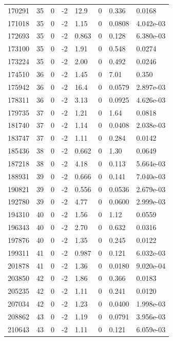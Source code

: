 \documentclass[preview]{standalone}
\begin{document}
{{{{{{{{{\begin{tabular}{L{1.2cm}C{1.2cm} C{0.3cm}C{0.5cm} C{1.4cm}C{1.4cm} C{1.4cm}C{1.4cm}}
  170291  &    35  & 0     & -2 &  12.9  & 0  & 0.336 &  0.0168   \\ 
  171018  &    35  & 0     & -2 &  1.15  & 0  & 0.0808 &  4.042e-03   \\ 
  172693  &    35  & 0     & -2 &  0.863  & 0  & 0.128 &  6.380e-03   \\ 
  173100  &    35  & 0     & -2 &  1.91  & 0  & 0.548 &  0.0274   \\ 
  173224  &    35  & 0     & -2 &  2.00  & 0  & 0.492 &  0.0246   \\ 
  174510  &    36  & 0     & -2 &  1.45  & 0  & 7.01 &  0.350   \\ 
  175942  &    36  & 0     & -2 &  16.4  & 0  & 0.0579 &  2.897e-03   \\ 
  178311  &    36  & 0     & -2 &  3.13  & 0  & 0.0925 &  4.626e-03   \\ 
  179735  &    37  & 0     & -2 &  1.21  & 0  & 1.64 &  0.0818   \\ 
  181740  &    37  & 0     & -2 &  1.14  & 0  & 0.0408 &  2.038e-03   \\ 
  183747  &    37  & 0     & -2 &  1.11  & 0  & 0.284 &  0.0142   \\ 
  185436  &    38  & 0     & -2 &  0.662  & 0  & 1.30 &  0.0649   \\ 
  187218  &    38  & 0     & -2 &  4.18  & 0  & 0.113 &  5.664e-03   \\ 
  188931  &    39  & 0     & -2 &  0.666  & 0  & 0.141 &  7.040e-03   \\ 
  190821  &    39  & 0     & -2 &  0.556  & 0  & 0.0536 &  2.679e-03   \\ 
  192780  &    39  & 0     & -2 &  4.77  & 0  & 0.0600 &  2.999e-03   \\ 
  194310  &    40  & 0     & -2 &  1.56  & 0  & 1.12 &  0.0559   \\ 
  196343  &    40  & 0     & -2 &  2.70  & 0  & 0.632 &  0.0316   \\ 
  197876  &    40  & 0     & -2 &  1.35  & 0  & 0.245 &  0.0122   \\ 
  199311  &    41  & 0     & -2 &  0.987  & 0  & 0.121 &  6.032e-03   \\ 
  201878  &    41  & 0     & -2 &  1.36  & 0  & 0.0180 &  9.020e-04   \\ 
  203850  &    42  & 0     & -2 &  1.86  & 0  & 0.366 &  0.0183   \\ 
  205235  &    42  & 0     & -2 &  1.11  & 0  & 0.241 &  0.0120   \\ 
  207034  &    42  & 0     & -2 &  1.23  & 0  & 0.0400 &  1.998e-03   \\ 
  208862  &    43  & 0     & -2 &  1.19  & 0  & 0.0791 &  3.956e-03   \\ 
  210643  &    43  & 0     & -2 &  1.11  & 0  & 0.121 &  6.059e-03   \\ 
\hline 
\end{tabular} 

}}}}}}}}}
\end{document}
